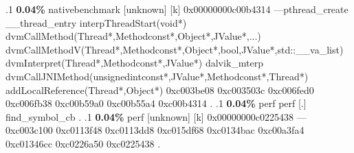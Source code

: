 \begin{profile}
{.1 \textbf{ 0.04\%} nativebenchmark  [unknown]              [k] 0x00000000c00b4314\newline {} ---pthread\_create\newline {} \_\_thread\_entry\newline {} interpThreadStart(void*)\newline {} dvmCallMethod(Thread*,Methodconst*,Object*,JValue*,...)\newline {} dvmCallMethodV(Thread*,Methodconst*,Object*,bool,JValue*,std::\_\_va\_list)\newline {} dvmInterpret(Thread*,Methodconst*,JValue*)\newline {} dalvik\_mterp\newline {} dvmCallJNIMethod(unsignedintconst*,JValue*,Methodconst*,Thread*)\newline {} addLocalReference(Thread*,Object*)\newline {} 0xc003be08\newline {} 0xc003503c\newline {} 0xc006fed0\newline {} 0xc006fb38\newline {} 0xc00b59a0\newline {} 0xc00b55a4\newline {} 0xc00b4314\newline {} . 
.1 \textbf{ 0.04\%} perf             perf                   [.] find\_symbol\_cb\newline {} . 
.1 \textbf{ 0.04\%} perf             [unknown]              [k] 0x00000000c0225438\newline {} ---0xc003c100\newline {} 0xc0113f48\newline {} 0xc0113dd8\newline {} 0xc015df68\newline {} 0xc0134bac\newline {} 0xc00a3fa4\newline {} 0xc01346cc\newline {} 0xc0226a50\newline {} 0xc0225438\newline {} . 
}
\end{profile}
